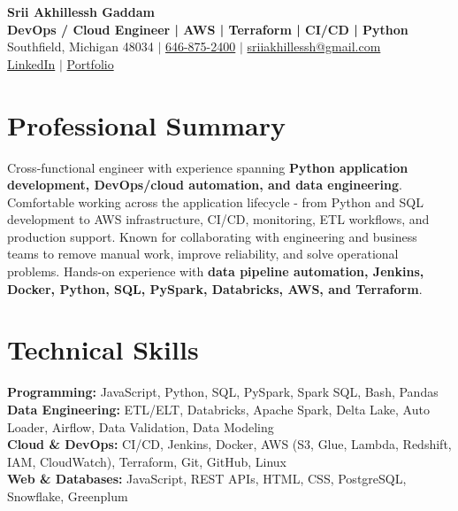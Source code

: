 \documentclass[letterpaper,10pt]{article}
\begin{document}
\fontsize{9.35pt}{10.45pt}\selectfont

\begin{center}
    {\LARGE \textbf{Srii Akhillessh Gaddam}} \\[-1pt]
    \textbf{DevOps / Cloud Engineer | AWS | Terraform | CI/CD | Python} \\[2pt]
    Southfield, Michigan 48034 $|$
    \href{tel:6468752400}{646-875-2400} $|$
    \href{mailto:sriiakhillessh@gmail.com}{sriiakhillessh@gmail.com} \\[1pt]
    \href{https://www.linkedin.com/in/srii-akhiilessh-gaddam-b48668191/}{LinkedIn} $|$
    \href{https://sriiakhillesshg.github.io/portfolio/}{Portfolio}
\end{center}
\vspace{-8pt}

\section{Professional Summary}
\small{Cross-functional engineer with experience spanning \textbf{Python application development, DevOps/cloud automation, and data engineering}. Comfortable working across the application lifecycle - from Python and SQL development to AWS infrastructure, CI/CD, monitoring, ETL workflows, and production support. Known for collaborating with engineering and business teams to remove manual work, improve reliability, and solve operational problems. Hands-on experience with \textbf{data pipeline automation, Jenkins, Docker, Python, SQL, PySpark, Databricks, AWS, and Terraform}.}

\section{Technical Skills}
\small{
\textbf{Programming:} JavaScript, Python, SQL, PySpark, Spark SQL, Bash, Pandas \\
\textbf{Data Engineering:} ETL/ELT, Databricks, Apache Spark, Delta Lake, Auto Loader, Airflow, Data Validation, Data Modeling \\
\textbf{Cloud \& DevOps:} CI/CD, Jenkins, Docker, AWS (S3, Glue, Lambda, Redshift, IAM, CloudWatch), Terraform, Git, GitHub, Linux \\
\textbf{Web \& Databases:} JavaScript, REST APIs, HTML, CSS, PostgreSQL, Snowflake, Greenplum
}
\end{document}
